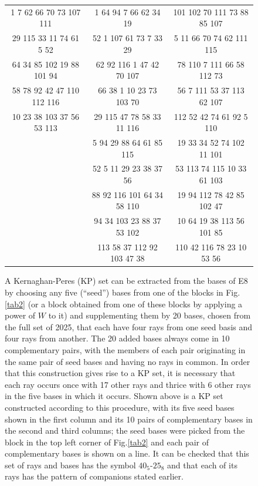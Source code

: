 \begin{figure}[ht]
\centering %
\begin{tabular}{|c | c |c |} %
\hline %
1	7	62	66	70	73	107	111&	1	64	94	7	66	62	34	19	&	101	102	70	111	73	88	85	107\\
29	115	33	11	74	61	5	52&	    52	1	107	61	73	7	33	29	&	5	11	66	70	74	62	111	115\\
64	34	85	102	19	88	101	94&		62	92	116	1	47	42	70	107	&	78	110	7	111	66	58	112	73\\
58	78	92	42	47	110	112	116&	66	38	1	10	23	73	103	70	&	56	7	111	53	37	113	62	107\\
10	23	38	103	37	56	53	113&	29	115	47	78	58	33	11	116	&	112	52	42	74	61	92	5	110\\
								&	5	94	29	88	64	61	85	115	&	19	33	34	52	74	102	11	101\\
								&	52	5	11	29	23	38	37	56	&	53	113	74	115	10	33	61	103\\
								&	88	92	116	101	64	34	58	110	&	19	94	112	78	42	85	102	47\\
								&	94	34	103	23	88	37	53	102	&	10	64	19	38	113	56	101	85\\
								&	113	58	37	112	92	103	47	38	&	110	42	116	78	23	10	53	56\\
\hline
\end{tabular}
\caption{A Kernaghan-Peres (KP) set can be extracted from the bases of E8 by choosing any five (``seed'') bases from one of the blocks in Fig.\ref{tab2} (or a block obtained from one of these blocks by applying a power of $W$ to it) and supplementing them by 20 bases, chosen from the full set of 2025, that each have four rays from one seed basis and four rays from another. The 20 added bases always come in 10 complementary pairs, with the members of each pair originating in the same pair of seed bases and having no rays in common. In order that this construction gives rise to a KP set, it is necessary that each ray occurs once with 17 other rays and thrice with 6 other rays in the five bases in which it occurs. Shown above is a KP set constructed according to this procedure, with its five seed bases shown in the first column and its 10 pairs of complementary bases in the second and third columns; the seed bases were picked from the block in the top left corner of Fig.\ref{tab2} and each pair of complementary bases is shown on a line. It can be checked that this set of rays and bases has the symbol $40_{5}$-$25_{8}$ and that each of its rays has the pattern of companions stated earlier.}
\label{tab3}
\end{figure}

